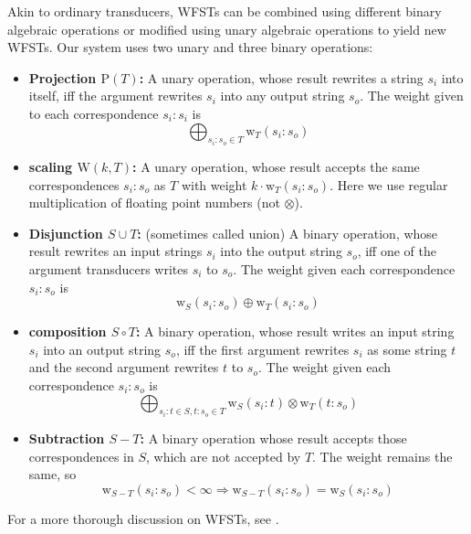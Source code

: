 \documentclass[a4paper,conference]{IEEEtran}
\begin{document}
Akin to ordinary transducers, WFSTs can be combined using
different binary algebraic operations or modified using unary
algebraic operations to yield new WFSTs. Our system uses two unary and three binary operations:
\begin{itemize}
\item {\bf Projection $\mathrm{P}(T)$:} A unary operation, whose result
  rewrites a string $s_i$ into itself, iff the argument rewrites $s_i$
  into any output string $s_o$. The weight given to each correspondence
  $s_i:s_i$ is
  \begin{equation}
    \bigoplus_{s_i\mathrm{:}s_o \in T} \mathrm{w}_T(s_i\mathrm{:}s_o)
  \end{equation}
\item {\bf scaling $\mathrm{W}(k,T)$:} A unary operation, whose result accepts the same correspondences $s_i\mathrm{:}s_o$ as $T$ with weight $k\cdot \mathrm{w}_T(s_i\mathrm{:}s_o)$. Here we use regular multiplication of floating point numbers (not $\otimes$).
\item {\bf Disjunction $S \cup T$:} (sometimes called union) A binary
  operation, whose result rewrites an input strings $s_i$ into the
  output string $s_o$, iff one of the argument transducers writes
  $s_i$ to $s_o$. The weight given each correspondence
  $s_i\mathrm{:}s_o$ is
  \begin{equation}
    \mathrm{w}_S(s_i\mathrm{:}s_o) \oplus \mathrm{w}_T(s_i\mathrm{:}s_o)
  \end{equation}
\item {\bf composition $S \circ T$:} A binary operation, whose result
  writes an input string $s_i$ into an output string $s_o$, iff the
  first argument rewrites $s_i$ as some string $t$ and the second
  argument rewrites $t$ to $s_o$. The weight given each correspondence
  $s_i\mathrm{:}s_o$ is
  \begin{equation}
    \bigoplus_{s_i\mathrm{:}t \in S, t\mathrm{:}s_o \in T} \mathrm{w}_S(s_i\mathrm{:}t) \otimes \mathrm{w}_T(t\mathrm{:}s_o)
    \end{equation}
\item {\bf Subtraction $S - T$:} A binary operation whose result accepts those correspondences in $S$, which are not accepted by $T$. The weight remains the same, so
  \begin{equation}
    \mathrm{w}_{S-T}(s_i\mathrm{:}s_o) < \infty \Rightarrow \mathrm{w}_{S-T}(s_i\mathrm{:}s_o) = \mathrm{w}_{S}(s_i\mathrm{:}s_o)
  \end{equation}
\end{itemize}
For a more thorough discussion on WFSTs, see \cite{openfst/2007}.
\end{document}
